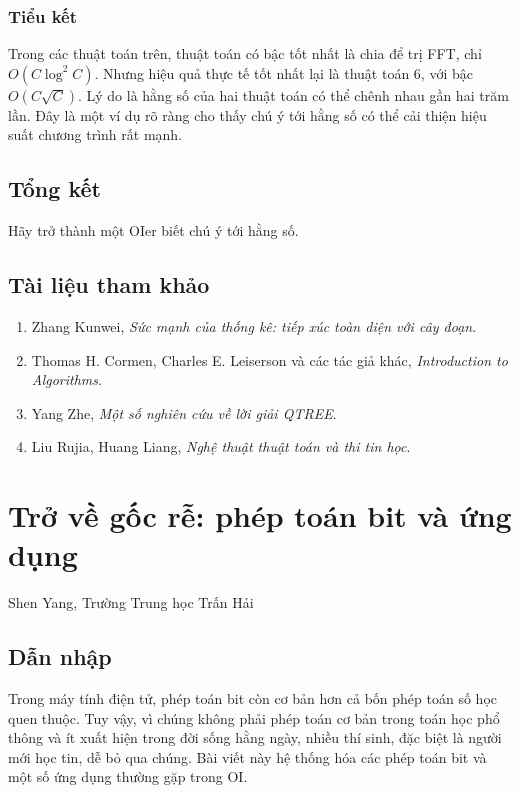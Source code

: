 \documentclass[11pt]{article}
\begin{document}
\subsubsection{Tiểu kết}

Trong các thuật toán trên, thuật toán có bậc tốt nhất là chia để trị FFT, chỉ
\(O(C\log^2 C)\). Nhưng hiệu quả thực tế tốt nhất lại là thuật toán 6, với bậc
\(O(C\sqrt C)\). Lý do là hằng số của hai thuật toán có thể chênh nhau gần hai
trăm lần. Đây là một ví dụ rõ ràng cho thấy chú ý tới hằng số có thể cải thiện
hiệu suất chương trình rất mạnh.

\subsection{Tổng kết}

Hãy trở thành một OIer biết chú ý tới hằng số.

\subsection*{Tài liệu tham khảo}

\begin{enumerate}
  \item Zhang Kunwei, \emph{Sức mạnh của thống kê: tiếp xúc toàn diện với cây
  đoạn}.
  \item Thomas H. Cormen, Charles E. Leiserson và các tác giả khác,
  \emph{Introduction to Algorithms}.
  \item Yang Zhe, \emph{Một số nghiên cứu về lời giải QTREE}.
  \item Liu Rujia, Huang Liang, \emph{Nghệ thuật thuật toán và thi tin học}.
\end{enumerate}

\section{Trở về gốc rễ: phép toán bit và ứng dụng}

\begin{center}
Shen Yang, Trường Trung học Trấn Hải
\end{center}

\subsection{Dẫn nhập}

Trong máy tính điện tử, phép toán bit còn cơ bản hơn cả bốn phép toán số học
quen thuộc. Tuy vậy, vì chúng không phải phép toán cơ bản trong toán học phổ
thông và ít xuất hiện trong đời sống hằng ngày, nhiều thí sinh, đặc biệt là
người mới học tin, dễ bỏ qua chúng. Bài viết này hệ thống hóa các phép toán
bit và một số ứng dụng thường gặp trong OI.
\end{document}
